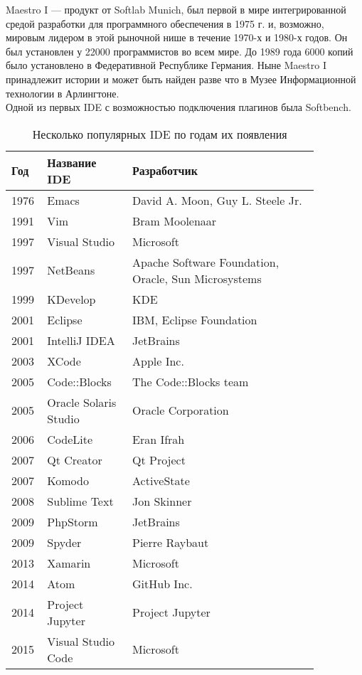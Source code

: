 Maestro I — продукт от Softlab Munich, был первой в мире интегрированной средой разработки для программного обеспечения в 1975 г. и, возможно, мировым лидером в этой рыночной нише в течение 1970-х и 1980-х годов. Он был установлен у 22000 программистов во всем мире. До 1989 года 6000 копий было установлено в Федеративной Республике Германия. Ныне Maestro I принадлежит истории и может быть найден разве что в Музее Информационной технологии в Арлингтоне.\\

Одной из первых IDE с возможностью подключения плагинов была Softbench.\\

\newpage
\begin{table}[h]
    \caption{Несколько популярных IDE по годам их появления}
    \centering
    \begin{tabular}[h!]{| p{0.055\linewidth} | p{0.25\linewidth} | p{0.55\linewidth} |}
        \hline
        \rowcolor{gray}Год & Название IDE & Разработчик\\\hline\hline
        1976 & Emacs & David A. Moon, Guy L. Steele Jr.\\\hline
        1991 & Vim & Bram Moolenaar\\\hline
        1997 & Visual Studio & Microsoft\\\hline
        1997 & NetBeans & Apache Software Foundation, Oracle, Sun Microsystems\\ \hline
        1999 & KDevelop & KDE\\\hline
        2001 & Eclipse & IBM, Eclipse Foundation\\\hline
        2001 & IntelliJ IDEA & JetBrains\\\hline
        2003 & XCode & Apple Inc.\\\hline
        2005 & Code::Blocks & The Code::Blocks team\\\hline
        2005 & Oracle Solaris Studio & Oracle Corporation \\\hline 
        2006 & CodeLite & Eran Ifrah \\\hline
        2007 & Qt Creator & Qt Project\\\hline
        2007 & Komodo & ActiveState \\\hline
        2008 & Sublime Text & Jon Skinner\\\hline
        2009 & PhpStorm & JetBrains\\\hline
        2009 & Spyder & Pierre Raybaut \\\hline
        2013 & Xamarin & Microsoft\\\hline
        2014 & Atom & GitHub Inc. \\\hline
        2014 & Project Jupyter & Project Jupyter\\\hline
        2015 & Visual Studio Code & Microsoft \\\hline
    \end{tabular}
\end{table}
